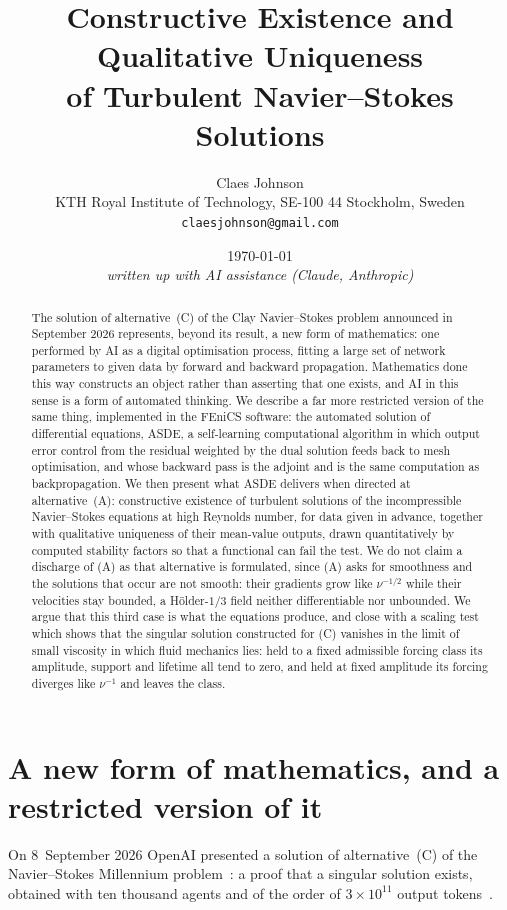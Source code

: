 \documentclass[11pt]{article}
\title{\vspace{-2em}Constructive Existence and Qualitative Uniqueness\\of Turbulent Navier--Stokes Solutions}
\author{Claes Johnson\\[0.2em]
\small KTH Royal Institute of Technology, SE-100 44 Stockholm, Sweden\\
\small \texttt{claesjohnson@gmail.com}}
\date{\today\\[0.4em]\small\textit{written up with AI assistance (Claude, Anthropic)}}
\begin{document}
\maketitle

\begin{abstract}
The solution of alternative~(C) of the Clay Navier--Stokes problem announced in September 2026
represents, beyond its result, a new form of mathematics: one performed by AI as a digital
optimisation process, fitting a large set of network parameters to given data by forward and
backward propagation. Mathematics done this way constructs an object rather than asserting that one
exists, and AI in this sense is a form of automated thinking. We describe a far more
restricted version of the same thing, implemented in the FEniCS software: the automated solution of
differential equations, ASDE, a self-learning computational
algorithm in which output error control from the residual weighted by the dual solution feeds back to
mesh optimisation, and whose backward pass is the adjoint and is the same computation as
backpropagation. We then present what
ASDE delivers when directed at alternative~(A): constructive existence of turbulent solutions of the
incompressible Navier--Stokes equations at high Reynolds number, for data given in advance, together
with qualitative uniqueness of their mean-value outputs, drawn quantitatively by computed stability
factors so that a functional can fail the test. We do not claim a discharge of (A) as that
alternative is formulated, since (A) asks for smoothness and the solutions that occur are not
smooth: their gradients grow like $\nu^{-1/2}$ while their velocities stay bounded, a
H\"older-$1/3$ field neither differentiable nor unbounded. We argue that this third case is what
the equations produce, and close with a scaling test which shows that the singular solution
constructed for (C) vanishes in the limit of small viscosity in which fluid mechanics lies: held to
a fixed admissible forcing class its amplitude, support and lifetime all tend to zero, and held at
fixed amplitude its forcing diverges like $\nu^{-1}$ and leaves the class.
\end{abstract}

\section{A new form of mathematics, and a restricted version of it}

On 8~September 2026 OpenAI presented a solution of alternative~(C) of the Navier--Stokes
Millennium problem~\cite{openai}: a proof that a singular solution exists, obtained with ten
thousand agents and of the order of $3\times10^{11}$ output tokens~\cite{buckmaster}.
\end{document}
